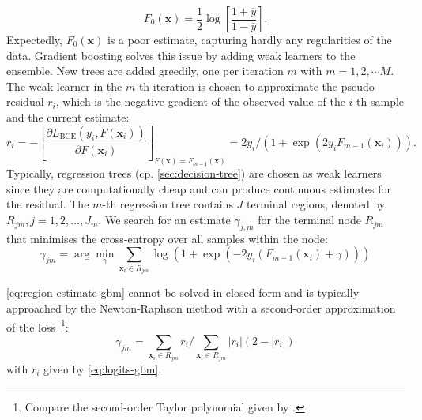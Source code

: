\begin{equation}
    F_0(\mathbf{x})= \frac{1}{2} \log \left[\frac{1+\bar{y}}{1-\bar{y}}\right].
\end{equation}
Expectedly, $F_0(\mathbf{x})$ is a poor estimate, capturing hardly any regularities of the data. Gradient boosting solves this issue by adding weak learners to the ensemble. New trees are added greedily, one per iteration $m$ with $m=1,2,\cdots M$. The weak learner in the $m$-th iteration is chosen to approximate the pseudo residual $r_i$, which is the negative gradient of the observed value of the $i$-th sample and the current estimate:
\begin{equation}
    r_i=-\left[\frac{\partial L_{\mathrm{BCE}}\left(y_i, F\left(\mathbf{x}_i\right)\right)}{\partial F\left(\mathbf{x}_i\right)}\right]_{F(\mathbf{x})=F_{m-1}(\mathbf{x})}=2 y_i /\left(1+\exp \left(2 y_i F_{m-1}\left(\mathbf{x}_i\right)\right)\right).
\end{equation}
Typically, regression trees (cp. \cref{sec:decision-tree}) are chosen as weak learners since they are computationally cheap and can produce continuous estimates for the residual. The $m$-th regression tree contains $J$ terminal regions, denoted by $R_{j m}, j=1,2, \ldots, J_{m}$. We search for an estimate $\gamma_{j,m}$ for the terminal node $R_{jm}$ that minimises the cross-entropy over all samples within the node:
\begin{equation}
    \gamma_{j m}=\arg \min _\gamma \sum_{\mathbf{x}_i \in R_{j m}} \log \left(1+\exp \left(-2 y_i\left(F_{m-1}\left(\mathbf{x}_i\right)+\gamma\right)\right)\right)
    \label{eq:region-estimate-gbm}
\end{equation}

\cref{eq:region-estimate-gbm} cannot be solved in closed form and is typically approached by the Newton-Raphson method with a second-order approximation of the loss~\footnote{Compare the second-order Taylor polynomial given by .}:
\begin{equation}
    \gamma_{j m}=\sum_{\mathbf{x}_i \in R_{j m}} r_i / \sum_{\mathbf{x}_i \in R_{j m}}\left|r_i\right|\left(2-\left|r_i\right|\right)
\end{equation}
with $r_i$ given by \cref{eq:logits-gbm}.

